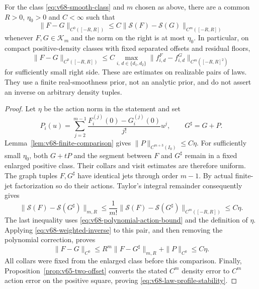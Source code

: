 \begin{theorem}
\label{thm:v68-smooth-stability}
For the class \eqref{eq:v68-smooth-class} and $m$ chosen as above,
there are a common $R>0$, $\eta_0>0$ and $C<\infty$ such that
\begin{equation}\label{eq:v68-real-profile-stability}
 \|F-G\|_{C^0([-R,R])}
       \le C\|\mathcal S(F)-\mathcal S(G)\|_{C^m([-R,R])}
\end{equation}
whenever $F,G\in\mathcal K_m$ and the norm on the right is at most
$\eta_0$.  In particular, on compact positive-density classes with
fixed separated offsets and residual floors,
\begin{equation}\label{eq:v68-law-profile-stability}
 \|F-G\|_{C^0([-R,R])}
 \le C\max_{i,\,d\in\{d_1,d_2\}}
                 \|f^F_{i,d}-f^G_{i,d}\|_{C^m([-R,R]^2)}
\end{equation}
for sufficiently small right side.  These are estimates on realizable
pairs of laws.  They use a finite real-smoothness prior, not an analytic
prior, and do not assert an inverse on arbitrary density tuples.
\end{theorem}
\begin{proof}
Let $\eta$ be the action norm in the statement and set
\[
 P_i(u)=\sum_{j=2}^{m-1}
          \frac{F_i^{(j)}(0)-G_i^{(j)}(0)}{j!}u^j,
 \qquad G^\sharp=G+P.
\]
Lemma~\ref{lem:v68-finite-comparison} gives
$\|P\|_{C^{m+3}(I_0)}\le C\eta$.
For sufficiently small $\eta_0$, both $G+tP$ and the segment
between $F$ and $G^\sharp$ remain in a fixed enlarged positive
class.  Their collars and visit estimates are therefore uniform.
The graph tuples $F,G^\sharp$ have identical jets through order
$m-1$.  By actual finite-jet factorization so do their actions.
Taylor's integral remainder consequently gives
\[
 \|\mathcal S(F)-\mathcal S(G^\sharp)\|_{m,R}
 \le\frac1{m!}
       \|\mathcal S(F)-\mathcal S(G^\sharp)\|_{C^m([-R,R])}
 \le C\eta.
\]
The last inequality uses \eqref{eq:v68-polynomial-action-bound}
and the definition of $\eta$.  Applying
\eqref{eq:v68-weighted-inverse} to this pair, and then removing the
polynomial correction, proves
\[
 \|F-G\|_{C^0}\le R^m\|F-G^\sharp\|_{m,R}+\|P\|_{C^0}
                                                   \le C\eta.
\]
All collars were fixed from the enlarged class before this comparison.
Finally, Proposition~\ref{prop:v65-two-offset} converts the stated
$C^m$ density error to $C^m$ action error on the positive square,
proving \eqref{eq:v68-law-profile-stability}.
\end{proof}

